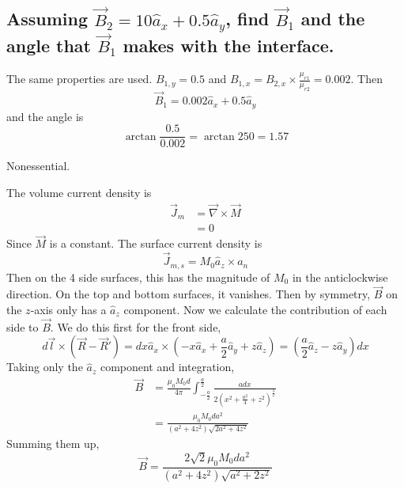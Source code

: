 \documentclass[answers]{exam}
\begin{document}
\begin{questions}
\begin{parts}
    \part{Assuming $\vec B_2 = 10\hat a_x + 0.5\hat a_y$, find $\vec B_1$ and the angle that $\vec B_1$ makes with the interface.}

    \begin{solution}
        The same properties are used. $B_{1,y} = 0.5$ and $B_{1,x} = B_{2,x}\times\frac{\mu_{r1}}{\mu_{r2}} = 0.002$. Then
        $$\vec B_1 = 0.002\hat a_x + 0.5\hat a_y$$
        and the angle is
        $$\arctan\frac{0.5}{0.002} = \arctan 250 = 1.57$$
    \end{solution}
\end{parts}


\begin{solution}
    Nonessential.
\end{solution}


\begin{solution}
    The volume current density is
    \begin{align*}
        \vec J_m &= \vec\nabla \times \vec M \\
                 &= 0
    \end{align*}
    Since $\vec M$ is a constant. The surface current density is
    $$\vec J_{m,s} = M_0\hat a_z \times a_n$$
    Then on the 4 side surfaces, this has the magnitude of $M_0$ in the anticlockwise direction. On the top and bottom surfaces, it vanishes. Then by symmetry, $\vec B$ on the $z$-axis only has a $\hat a_z$ component. Now we calculate the contribution of each side to $\vec B$. We do this first for the front side,
    $$d\vec l \times (\vec R - \vec R') = dx\hat a_x \times \left(-x\hat a_x + \frac{a}{2}\hat a_y + z\hat a_z\right) = (\frac{a}{2} \hat a_z - z \hat a_y)dx$$
    Taking only the $\hat a_z$ component and integration,
    \begin{align*}
        \vec B &= \frac{\mu_0 M_0 d}{4\pi} \int_{-\frac{a}{2}}^{\frac{a}{2}} \frac{adx}{2(x^2 + \frac{a^2}{4} + z^2)^{\frac{3}{2}}} \\
               &= \frac{\mu_0M_0da^2}{(a^2+4z^2)\sqrt{2a^2+4z^2}}
    \end{align*}
    Summing them up,
    $$\vec B = \frac{2\sqrt{2}\mu_0M_0da^2}{(a^2+4z^2)\sqrt{a^2+2z^2}}$$
\end{solution}


\end{questions}
\end{document}
